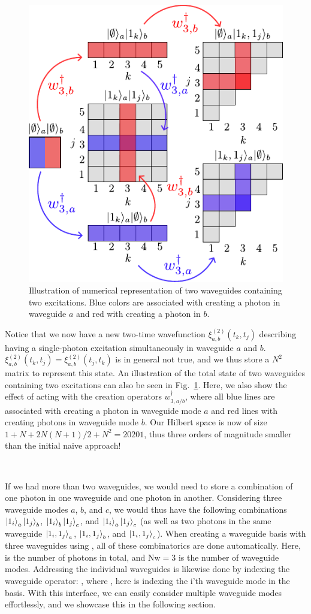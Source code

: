 \begin{figure}
    \centering
    \includegraphics[width = 0.6 \linewidth]{figures/multiplewaveguides_illustration.pdf}
    \caption{Illustration of numerical representation of two waveguides containing two excitations. Blue colors are associated with creating a photon in waveguide $a$ and red with creating a photon in $b$. }
    \label{fig:twowaveguide_illustration}
\end{figure}

Notice that we now have a new two-time wavefunction $\xi^{(2)}_{a,b}(t_k,t_j)$ describing having a single-photon excitation simultaneously in waveguide $a$ and $b$. $\xi^{(2)}_{a,b}(t_k,t_j) = \xi^{(2)}_{a,b}(t_j,t_k)$ is in general not true, and we thus store a $N^2$ matrix to represent this state. An illustration of the total state of two waveguides containing two excitations can also be seen in Fig.~\ref{fig:twowaveguide_illustration}. Here, we also show the effect of acting with the creation operators $w^\dagger_{3,a/b}$, where all blue lines are associated with creating a photon in waveguide mode $a$ and red lines with creating photons in waveguide mode $b$. Our Hilbert space is now of size $1+N+2 N(N+1)/2 + N^2 = 20201$, thus three orders of magnitude smaller than the initial naive approach!

\

If we had more than two waveguides, we would need to store a combination of one photon in one waveguide and one photon in another. Considering three waveguide modes $a$, $b$, and $c$, we would thus have the following combinations $\ket{1_i}_a\ket{1_j}_b$, $\ket{1_i}_b\ket{1_j}_c$, and $\ket{1_i}_a\ket{1_j}_c$ (as well as two photons in the same waveguide $\ket{1_i,1_j}_{a}$, $\ket{1_i,1_j}_{b}$, and $\ket{1_i,1_j}_{c}$). When creating a waveguide basis with three waveguides using , all of these combinatorics are done automatically. Here,  is the number of photons in total, and $\mathrm{Nw}=3$ is the number of waveguide modes. Addressing the individual waveguides is likewise done by indexing the waveguide operator: , where , here is indexing the i'th waveguide mode in the basis. With this interface, we can easily consider multiple waveguide modes effortlessly, and we showcase this in the following section.  





